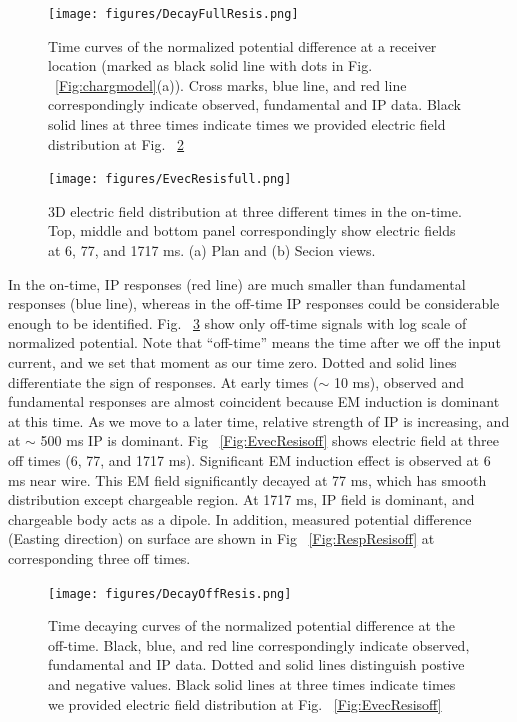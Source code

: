 \documentclass[letterpaper,11pt]{article}
\begin{document}
\begin{figure}[htb]
  \centering
  \texttt{[image: figures/DecayFullResis.png]}
  \caption{Time curves of the normalized potential difference at a receiver location (marked as black solid line with dots in Fig. ~\ref{Fig:chargmodel}(a)). Cross marks, blue line, and red line correspondingly indicate observed, fundamental and IP data. Black solid lines at three times indicate times we provided electric field distribution at Fig. ~\ref{Fig:EvecResisfull}}
  \label{Fig:DecayFullResis}
\end{figure}

\begin{figure}[htb]
  \centering
  \texttt{[image: figures/EvecResisfull.png]}
  \caption{3D electric field distribution at three different times in the on-time. Top, middle and bottom panel correspondingly show electric fields at 6, 77, and 1717 ms. (a) Plan and (b) Secion views. }
  \label{Fig:EvecResisfull}
\end{figure}

In the on-time, IP responses (red line) are much smaller than fundamental responses (blue line), whereas in the off-time IP responses could be considerable enough to be identified. Fig. ~\ref{Fig:DecayOffResis} show only off-time signals with log scale of normalized potential. Note that ``off-time'' means the time after we off the input current, and we set that moment as our time zero. Dotted and solid lines differentiate the sign of responses. At early times ($\sim$ 10 ms), observed and fundamental responses are almost coincident because EM induction is dominant at this time. As we move to a later time, relative strength of IP is increasing, and at $\sim$ 500 ms IP is dominant. Fig ~\ref{Fig:EvecResisoff} shows electric field at three off times (6, 77, and 1717 ms). Significant EM induction effect is observed at 6 ms near wire. This EM field significantly decayed at 77 ms, which has smooth distribution except chargeable region. At 1717 ms, IP field is dominant, and chargeable body acts as a dipole. 
In addition, measured potential difference (Easting direction) on surface are shown  in Fig ~\ref{Fig:RespResisoff} at corresponding three off times. 

\begin{figure}[htb]
  \centering
  \texttt{[image: figures/DecayOffResis.png]}
  \caption{Time decaying curves of the normalized potential difference at the off-time. Black, blue, and red line correspondingly indicate observed, fundamental and IP data. Dotted and solid lines distinguish postive and negative values. Black solid lines at three times indicate times we provided electric field distribution at Fig. ~\ref{Fig:EvecResisoff}}
  \label{Fig:DecayOffResis}
\end{figure}
\end{document}
